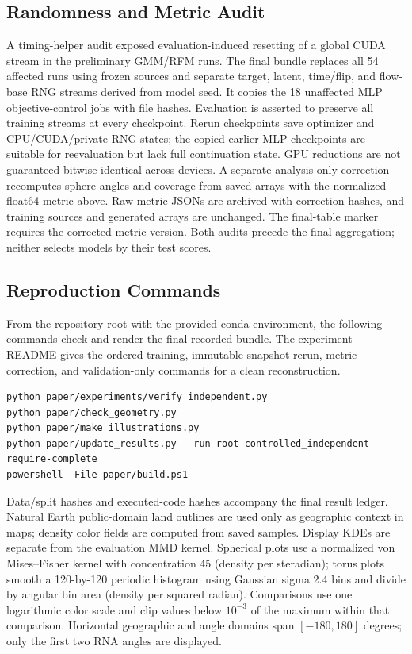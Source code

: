 \subsection{Randomness and Metric Audit}
A timing-helper audit exposed evaluation-induced resetting of a global CUDA stream in the preliminary GMM/RFM runs. The final bundle replaces all 54 affected runs using frozen sources and separate target, latent, time/flip, and flow-base RNG streams derived from model seed. It copies the 18 unaffected MLP objective-control jobs with file hashes. Evaluation is asserted to preserve all training streams at every checkpoint. Rerun checkpoints save optimizer and CPU/CUDA/private RNG states; the copied earlier MLP checkpoints are suitable for reevaluation but lack full continuation state. GPU reductions are not guaranteed bitwise identical across devices.
A separate analysis-only correction recomputes sphere angles and coverage from saved arrays with the normalized float64 metric above. Raw metric JSONs are archived with correction hashes, and training sources and generated arrays are unchanged. The final-table marker requires the corrected metric version. Both audits precede the final aggregation; neither selects models by their test scores.
\subsection{Reproduction Commands}
From the repository root with the provided conda environment, the following commands check and render the final recorded bundle. The experiment README gives the ordered training, immutable-snapshot rerun, metric-correction, and validation-only commands for a clean reconstruction.
\begingroup\small\begin{verbatim}
python paper/experiments/verify_independent.py
python paper/check_geometry.py
python paper/make_illustrations.py
python paper/update_results.py --run-root controlled_independent --require-complete
powershell -File paper/build.ps1
\end{verbatim}\endgroup
Data/split hashes and executed-code hashes accompany the final result ledger. Natural Earth public-domain land outlines are used only as geographic context in maps; density color fields are computed from saved samples.
Display KDEs are separate from the evaluation MMD kernel. Spherical plots use a normalized von Mises--Fisher kernel with concentration 45 (density per steradian); torus plots smooth a 120-by-120 periodic histogram using Gaussian sigma 2.4 bins and divide by angular bin area (density per squared radian). Comparisons use one logarithmic color scale and clip values below $10^{-3}$ of the maximum within that comparison. Horizontal geographic and angle domains span $[-180,180]$ degrees; only the first two RNA angles are displayed.
